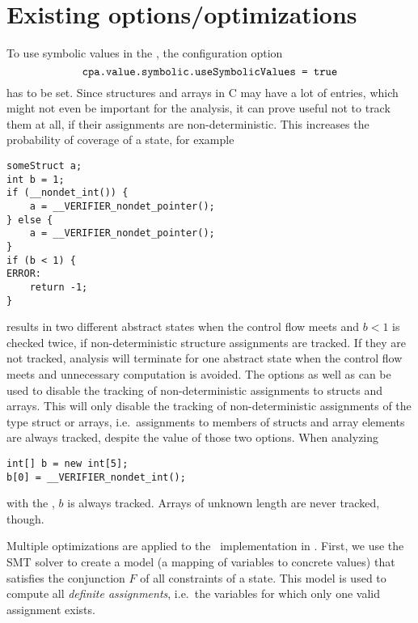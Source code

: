 \section{Existing options/optimizations}
To use symbolic values in the , the configuration option
\[\texttt{cpa.value.symbolic.useSymbolicValues = true}\] has to be set.
Since structures and arrays in C may have a lot of entries, which might not even be important for the analysis,
it can prove useful not to track them at all, if their assignments are non-deterministic.
This increases the probability of coverage of a state, for example
\begin{lstlisting}
someStruct a;
int b = 1;
if (__nondet_int()) {
	a = __VERIFIER_nondet_pointer();
} else {
	a = __VERIFIER_nondet_pointer();
}
if (b < 1) {
ERROR:
	return -1;
}
\end{lstlisting}
results in two different abstract states when the control flow meets and $b < 1$ is checked twice, if non-deterministic structure assignments are tracked.
If they are not tracked, analysis will terminate for one abstract state when the control flow meets and unnecessary computation is avoided.
The options  as well as 
can be used to disable the tracking of non-deterministic assignments to structs and arrays.
This will only disable the tracking of non-deterministic assignments of the type struct or arrays, i.e.\ assignments to members of structs and array elements
are always tracked, despite the value of those two options.
When analyzing
\begin{lstlisting}
int[] b = new int[5];
b[0] = __VERIFIER_nondet_int();
\end{lstlisting}
with the \symbolicExecutionCPA, $b$ is always tracked.
Arrays of unknown length are never tracked, though.

Multiple optimizations are applied to the \constraintsCPA\ implementation in \cpaChecker.
First, we use the SMT solver to create a model (a mapping of variables to concrete values) that satisfies the conjunction $F$ of all constraints of a state.
This model is used to compute all \emph{definite assignments}, i.e.\ the variables for which only one valid assignment exists.

